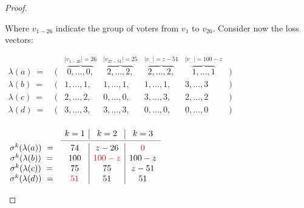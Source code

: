 \documentclass[version=3.21, pagesize, notitlepage, twoside=off, bibliography=totoc, DIV=calc, fontsize=12pt, a4paper]{scrartcl}
\begin{document}
\begin{proof}
\begin{example}
	Where $v_{1-26}$ indicate the group of voters from $v_1$ to $v_{26}$. Consider now the loss vectors: 

	\begin{center}
		$
		\begin{array}{ccccccc}
		\lambda(a)\ = \ &(& \overbrace{0, \dots,0,}^{|v_{1-26}|=26} & \overbrace{2, \dots, 2,}^{|v_{27-51}|=25} & \overbrace{2, \dots, 2,}^{|v_{\dots}|=z-51} & \overbrace{1, \dots, 1}^{|v_{\dots}|=100-z} &) \\
		\lambda(b)\ = \ &(& 1, \dots,1, & 1, \dots, 1, & 1, \dots, 1, & 3, \dots, 3 &) \\
		\lambda(c)\ = \ &(& 2, \dots,2, & 0, \dots, 0, & 3, \dots, 3, & 2, \dots, 2 &) \\
		\lambda(d)\ = \ &(& 3, \dots,3, & 3, \dots, 3, & 0, \dots, 0, & 0, \dots, 0 &) \\
		\end{array}
		$
	\end{center}
	
	\begin{center}
		$
		\begin{array}{cc|c|c}
		& k=1 & k=2 & k=3 \\ \cmidrule{2-4}
		\sigma^k (\lambda (a))\ = \ & 74 & z-26 & {\color{red}0} \\
		\sigma^k (\lambda (b))\ = \ & 100 & {\color{red}100-z} & 100-z \\
		\sigma^k (\lambda (c))\ = \ & 75 & 75 & z-51 \\
		\sigma^k (\lambda (d))\ = \ & {\color{red}51} & 51 & 51 \\
		\end{array}
		$
	\end{center}	
	

\end{example}
\end{proof}
\end{document}
